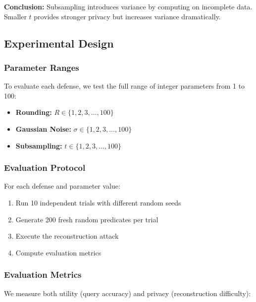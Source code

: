 \documentclass[11pt,letterpaper]{article}
\begin{document}
\textbf{Conclusion:} Subsampling introduces variance by computing on incomplete data. Smaller $t$ provides stronger privacy but increases variance dramatically.

\subsection{Experimental Design}

\subsubsection{Parameter Ranges}

To evaluate each defense, we test the full range of integer parameters from 1 to 100:

\begin{itemize}[leftmargin=*]
    \item \textbf{Rounding:} $R \in \{1, 2, 3, \ldots, 100\}$
    \item \textbf{Gaussian Noise:} $\sigma \in \{1, 2, 3, \ldots, 100\}$
    \item \textbf{Subsampling:} $t \in \{1, 2, 3, \ldots, 100\}$
\end{itemize}

\subsubsection{Evaluation Protocol}

For each defense and parameter value:

\begin{enumerate}[leftmargin=*]
    \item Run 10 independent trials with different random seeds
    \item Generate 200 fresh random predicates per trial
    \item Execute the reconstruction attack
    \item Compute evaluation metrics
\end{enumerate}

\subsubsection{Evaluation Metrics}

We measure both utility (query accuracy) and privacy (reconstruction difficulty):
\end{document}
